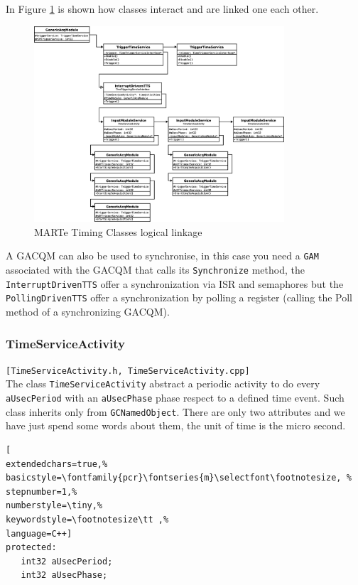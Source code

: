 In Figure \ref{f:MARTe:TimingClasses} is shown how classes interact and are linked one each other.

\begin{figure}[h!]
 \begin{center}
  \includegraphics[width=0.83\textwidth]{MARTe/TimingClasses.eps}
  \caption{MARTe Timing Classes logical linkage}
  \label{f:MARTe:TimingClasses}
 \end{center}
\end{figure}



A GACQM can also be used to synchronise, in this case you need a \texttt{GAM} associated with the GACQM that calls its \texttt{Synchronize} method, the \texttt{InterruptDrivenTTS} offer a synchronization via ISR and semaphores but the \texttt{PollingDrivenTTS} offer a synchronization by polling a register (calling the Poll method of a synchronizing GACQM).



\subsubsection{TimeServiceActivity}
\texttt{[TimeServiceActivity.h, TimeServiceActivity.cpp]} \\
The class \texttt{TimeServiceActivity} abstract a periodic activity to do every \texttt{aUsecPeriod} with an \texttt{aUsecPhase} phase respect to a defined time event. Such class inherits only from \texttt{GCNamedObject}. There are only two attributes and we have just spend some words about them, the unit of time is the micro second.

\begin{lstlisting}[
extendedchars=true,%
basicstyle=\fontfamily{pcr}\fontseries{m}\selectfont\footnotesize, %
stepnumber=1,%
numberstyle=\tiny,%
keywordstyle=\footnotesize\tt ,%
language=C++]
protected:
   int32 aUsecPeriod;
   int32 aUsecPhase;
\end{lstlisting}

